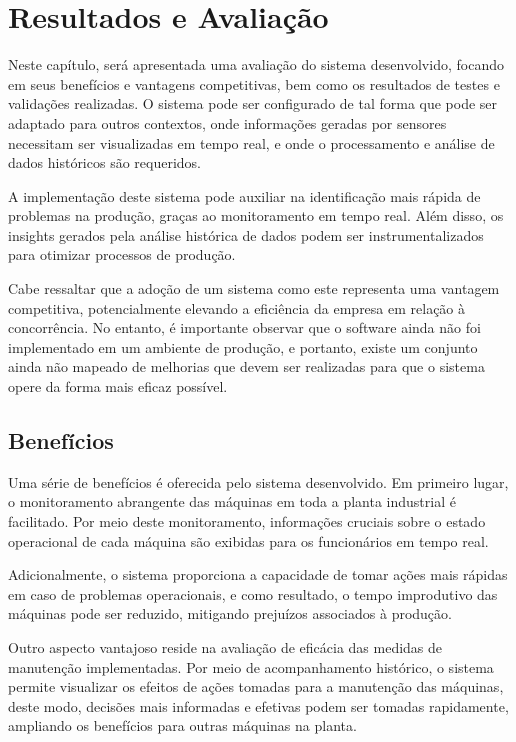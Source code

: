 \chapter{Resultados e Avaliação}\label{cap:results}
Neste capítulo, será apresentada uma avaliação do sistema desenvolvido, focando em seus benefícios e vantagens competitivas, bem como os resultados de testes e validações realizadas. O sistema pode ser configurado de tal forma que pode ser adaptado para outros contextos, onde informações geradas por sensores necessitam ser visualizadas em tempo real, e onde o processamento e análise de dados históricos são requeridos.

A implementação deste sistema pode auxiliar na identificação mais rápida de problemas na produção, graças ao monitoramento em tempo real. Além disso, os insights gerados pela análise histórica de dados podem ser instrumentalizados para otimizar processos de produção. 

Cabe ressaltar que a adoção de um sistema como este representa uma vantagem competitiva, potencialmente elevando a eficiência da empresa em relação à concorrência. No entanto, é importante observar que o software ainda não foi implementado em um ambiente de produção, e portanto, existe um conjunto ainda não mapeado de melhorias que devem ser realizadas para que o sistema opere da forma mais eficaz possível.


\section{Benefícios}\label{sec:benfits}

Uma série de benefícios é oferecida pelo sistema desenvolvido. Em primeiro lugar, o monitoramento abrangente das máquinas em toda a planta industrial é facilitado. Por meio deste monitoramento, informações cruciais sobre o estado operacional de cada máquina são exibidas para os funcionários em tempo real.

Adicionalmente, o sistema proporciona a capacidade de tomar ações mais rápidas em caso de problemas operacionais, e como resultado, o tempo improdutivo das máquinas pode ser reduzido, mitigando prejuízos associados à produção.

Outro aspecto vantajoso reside na avaliação de eficácia das medidas de manutenção implementadas. Por meio de acompanhamento histórico, o sistema permite visualizar os efeitos de ações tomadas para a manutenção das máquinas, deste modo, decisões mais informadas e efetivas podem ser tomadas rapidamente, ampliando os benefícios para outras máquinas na planta.


